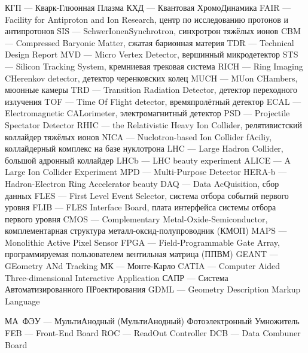 КГП --- Кварк-Глюонная Плазма
КХД --- Квантовая ХромоДинамика
FAIR --- Facility for Antiproton and Ion Research, центр по исследованию протонов и антипротонов
SIS --- SchwerIonenSynchrotron, синхротрон тяжёлых ионов
CBM --- Compressed Baryonic Matter, сжатая барионная материя
TDR --- Technical Design Report
MVD --- Micro Vertex Detector, вершинный микродетектор
STS --- Silicon Tracking System, кремниевая трековая система
RICH --- Ring Imaging CHerenkov detector, детектор черенковских колец
MUCH --- MUon CHambers, мюонные камеры
TRD --- Transition Radiation Detector, детектор переходного излучения
TOF --- Time Of Flight detector, времяпролётный детектор
ECAL --- Electromagnetic CALorimeter, электромагнитный детектор
PSD --- Projectile Spectator Detector
RHIC --- the Relativistic Heavy Ion Collider, релятивистский коллайдер тяжёлых ионов
NICA --- Nuclotron-based Ion Collider fAciliy, коллайдерный комплекс на базе нуклотрона
LHC --- Large Hadron Collider, большой адронный коллайдер
LHCb --- LHC beauty experiment
ALICE --- A Large Ion Collider Experiment
MPD --- Multi-Purpose Detector
HERA-b --- Hadron-Electron Ring Accelerator beauty
DAQ --- Data AcQuisition, сбор данных
FLES --- First Level Event Selector, система отбора событий первого уровня
FLIB --- FLES Interface Board, плата интерфейса системы отбора первого уровня
CMOS --- Complementary Metal-Oxide-Semiconductor, комплементарная структура металл-оксид-полупроводник (КМОП)
MAPS --- Monolithic Active Pixel Sensor
FPGA --- Field-Programmable Gate Array, программируемая пользователем вентильная матрица (ППВМ)
GEANT --- GEometry ANd Tracking
МК --- Монте-Карло
CATIA --- Computer Aided Three-dimensional Interactive Application
САПР --- Система Автоматизированного ПРоектирования
GDML --- Geometry Description Markup Language

МА~ФЭУ --- МультиАнодный (\todo МультиАнодный) Фотоэлектронный Умножитель
FEB --- Front-End Board
ROC --- ReadOut Controller
DCB --- Data Combuner Board

